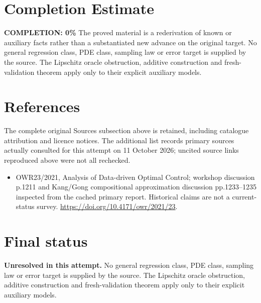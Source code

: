 \documentclass[11pt]{article}
\begin{document}
\section{Completion Estimate}
\noindent\textbf{COMPLETION: 0\%}
The proved material is a rederivation of known or auxiliary facts rather than a substantiated new advance on the original target. No general regression class, PDE class, sampling law or error target is supplied by the source. The Lipschitz oracle obstruction, additive construction and fresh-validation theorem apply only to their explicit auxiliary models.
\section{References}
The complete original Sources subsection above is retained, including catalogue attribution and licence notices. The additional list records primary sources actually consulted for this attempt on 11 October 2026; uncited source links reproduced above were not all rechecked.
\begin{itemize}
\item OWR23/2021, Analysis of Data-driven Optimal Control; workshop discussion p.1211 and Kang/Gong compositional approximation discussion pp.1233–1235 inspected from the cached primary report. Historical claims are not a current-status survey. \url{https://doi.org/10.4171/owr/2021/23}.
\end{itemize}
\section{Final status}
\textbf{Unresolved in this attempt.} No general regression class, PDE class, sampling law or error target is supplied by the source. The Lipschitz oracle obstruction, additive construction and fresh-validation theorem apply only to their explicit auxiliary models.
\end{document}
